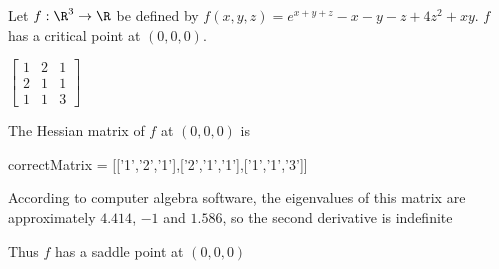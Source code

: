 \documentclass{ximera}
\begin{document}
	\begin{question}
		Let $f:\R^3 \to \R$ be defined by $f(x,y,z) = e^{x+y+z}  - x - y - z+ 4z^2+xy$.  $f$ has a critical point at $(0,0,0)$.
		\begin{solution}
			\begin{hint}
				\begin{question}
					\begin{solution}
						\begin{hint}
							\(
								\begin{bmatrix}
									1 &2 &1\\
									2& 1&1\\
									1&1&3
								\end{bmatrix}
							\)
						\end{hint}
						The Hessian matrix of $f$ at $(0,0,0)$ is
						\begin{matrix-answer}
							correctMatrix = [['1','2','1'],['2','1','1'],['1','1','3']]
						\end{matrix-answer}
					\end{solution}
				\end{question}
			\end{hint}
			\begin{hint}
				According to computer algebra software, the eigenvalues of this matrix are  approximately $4.414$, $-1$ and $1.586$, so the second derivative
				is indefinite
			\end{hint}
			\begin{hint}
				Thus $f$ has a saddle point at $(0,0,0)$
			\end{hint}
			\begin{multiple-choice}
			\end{multiple-choice}
		\end{solution}
	\end{question}
	
\end{document}
